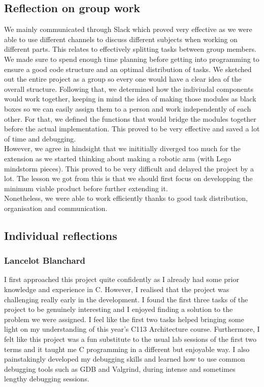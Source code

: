 \documentclass[11pt]{article}
\begin{document}
\subsection{Reflection on group work}
We mainly communicated through Slack which proved very effective as we were able
to use different channels to discuss different subjects when working on
different parts. This relates to effectively splitting tasks between group
members. We made sure to spend enough time planning before getting into
programming to ensure a good code structure and an optimal distribution of
tasks. We sketched out the entire project as a group so every one would have a
clear idea of the overall structure. Following that, we determined how the
indiviudal components would work together, keeping in mind the idea of making
those modules as black boxes so we can easily assign them to a person and work
independently of each other. For that, we defined the functions that would
bridge the modules together before the actual implementation. This proved to be
very effective and saved a lot of time and debugging.\\
However, we agree in hindsight that we inititially diverged too much for the
extension as we started thinking about making a robotic arm (with Lego mindstorm
pieces). This proved to be very difficult and delayed the project by a lot. The
lesson we got from this is that we should first focus on developping the minimum
viable product before further extending it.\\
Nonetheless, we were able to work efficiently thanks to good task distribution,
organisation and communication.

\subsection{Individual reflections}
\subsubsection{Lancelot Blanchard}
I first approached this project quite confidently as I already had some prior knowledge 
and experience in C. However, I realised that the project was challenging really early in 
the development. I found the first three tasks of the project to be genuinely interesting 
and I enjoyed finding a solution to the problem we were assigned. I feel like the first two 
tasks helped bringing some light on my understanding of this year's C113 Architecture course. 
Furthermore, I felt like this project was a fun substitute to the usual lab sessions of the 
first two terms and it taught me C programming in a different but enjoyable way. I also 
painstakingly developed my debugging skills and learned how to use common debugging tools such 
as GDB and Valgrind, during intense and sometimes lengthy debugging sessions. 
\end{document}

